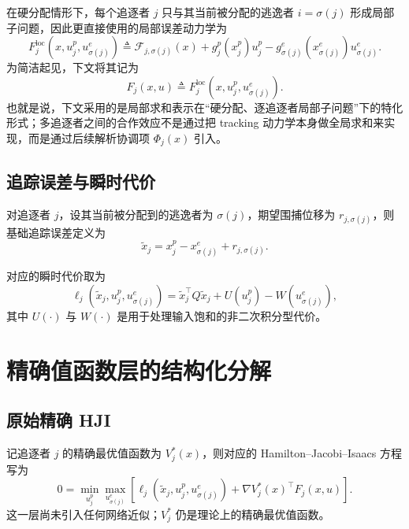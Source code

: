 \documentclass[11pt,a4paper]{article}
\begin{document}
在硬分配情形下，每个追逐者 $j$ 只与其当前被分配的逃逸者 $i=\sigma(j)$ 形成局部子问题，因此更直接使用的局部误差动力学为
\begin{equation}
F_j^{\mathrm{loc}}(x,u_j^p,u_{\sigma(j)}^e)
\triangleq
\mathcal F_{j,\sigma(j)}(x)
+
g_j^p(x_j^p)u_j^p
-
g_{\sigma(j)}^e(x_{\sigma(j)}^e)u_{\sigma(j)}^e.
\label{eq:F_local_assigned}
\end{equation}
为简洁起见，下文将其记为
\begin{equation}
F_j(x,u)\triangleq F_j^{\mathrm{loc}}(x,u_j^p,u_{\sigma(j)}^e).
\label{eq:Fj_short}
\end{equation}
也就是说，下文采用的是局部求和表示在“硬分配、逐追逐者局部子问题”下的特化形式；多追逐者之间的合作效应不是通过把 tracking 动力学本身做全局求和来实现，而是通过后续解析协调项 $\Phi_j(x)$ 引入。

\subsection{追踪误差与瞬时代价}

对追逐者 $j$，设其当前被分配到的逃逸者为 $\sigma(j)$，期望围捕位移为 $r_{j,\sigma(j)}$，则基础追踪误差定义为
\begin{equation}
\tilde x_j = x_j^p - x_{\sigma(j)}^e + r_{j,\sigma(j)}.
\label{eq:tracking_error}
\end{equation}

对应的瞬时代价取为
\begin{equation}
\ell_j(\tilde x_j,u_j^p,u_{\sigma(j)}^e)
=
\tilde x_j^\top Q\tilde x_j
+
U(u_j^p)-W(u_{\sigma(j)}^e),
\label{eq:stage_cost_original}
\end{equation}
其中 $U(\cdot)$ 与 $W(\cdot)$ 是用于处理输入饱和的非二次积分型代价。

\section{精确值函数层的结构化分解}

\subsection{原始精确 HJI}

记追逐者 $j$ 的精确最优值函数为 $V_j^*(x)$，则对应的 Hamilton--Jacobi--Isaacs 方程写为
\begin{equation}
0=
\min_{u_j^p}\max_{u_{\sigma(j)}^e}
\left[
\ell_j(\tilde x_j,u_j^p,u_{\sigma(j)}^e)
+
\nabla V_j^*(x)^\top F_j(x,u)
\right].
\label{eq:hji_original}
\end{equation}
这一层尚未引入任何网络近似；$V_j^*$ 仍是理论上的精确最优值函数。
\end{document}
